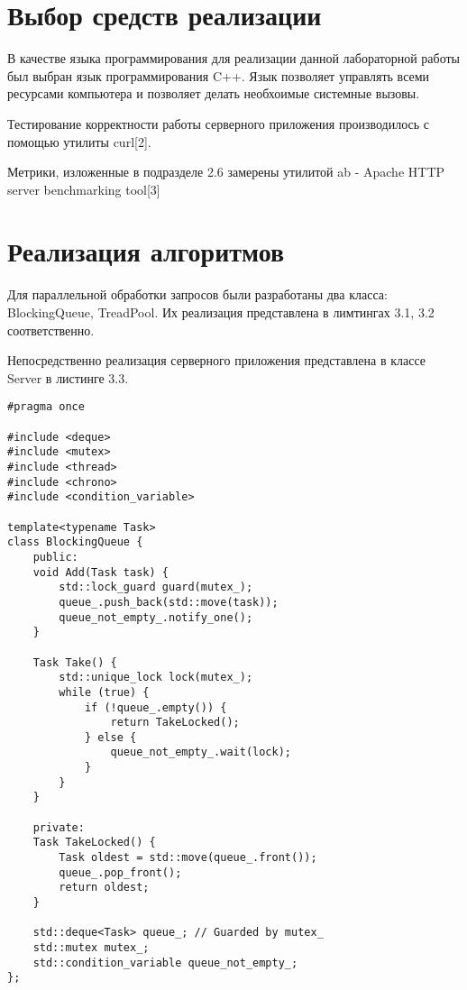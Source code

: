 \section{Выбор средств реализации}

В качестве языка программирования для реализации данной лабораторной работы был выбран язык программирования C++\cite{pythonlang}. Язык позволяет управлять всеми ресурсами компьютера и позволяет делать необхоимые системные вызовы.

Тестирование корректности работы серверного приложения производилось с помощью утилиты curl[2].

Метрики, изложенные в подразделе 2.6 замерены утилитой ab - Apache HTTP server benchmarking tool[3]

\section{Реализация алгоритмов}

Для параллельной обработки запросов были разработаны два класса: BlockingQueue, TreadPool. Их реализация представлена в лимтингах 3.1, 3.2 соответственно.

Непосредственно реализация серверного приложения представлена в классе Server в листинге 3.3. 

\begin{lstlisting}[caption=Реализация блокирующей очереди]
#pragma once

#include <deque>
#include <mutex>
#include <thread>
#include <chrono>
#include <condition_variable>

template<typename Task>
class BlockingQueue {
	public:
	void Add(Task task) {
		std::lock_guard guard(mutex_);
		queue_.push_back(std::move(task));
		queue_not_empty_.notify_one();
	}
	
	Task Take() {
		std::unique_lock lock(mutex_);
		while (true) {
			if (!queue_.empty()) {
				return TakeLocked();
			} else {
				queue_not_empty_.wait(lock);
			}
		}
	}
	
	private:
	Task TakeLocked() {
		Task oldest = std::move(queue_.front());
		queue_.pop_front();
		return oldest;
	}
	
	std::deque<Task> queue_; // Guarded by mutex_
	std::mutex mutex_;
	std::condition_variable queue_not_empty_;
};

\end{lstlisting}

